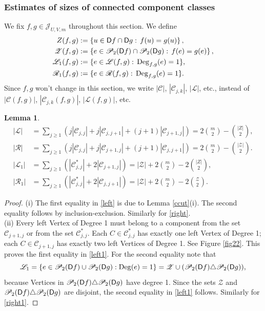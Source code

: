 \documentclass[reqno]{amsart}
\theoremstyle{theorem}
\newtheorem{lemma}[theorem]{Lemma}
\theoremstyle{definition}
\theoremstyle{remark}
\def\PP{\mathscr{P}}
\def\LL{\mathscr{L}}
\def\RR{\mathscr{R}}
\def\CC{\mathscr{C}}
\newcommand{\1}{{\text{\Large $\mathfrak 1$}}}	%
\numberwithin{equation}{section}
\def\JJ{\mathscr J}
\def\dom{{\sf D}}
\def\Deg{\operatorname{Deg}}
\def\xor{\text{\footnotesize$\triangle$}}
\def\ZZ{\mathscr Z}
\begin{document}
\subsubsection{\bfseries Estimates of sizes of connected component classes}
We fix $f,g \in \JJ_{U,V,m}$ throughout this section. We define
\begin{align}
Z(f,g) &:= \left\{ u \in \dom f \cap \dom g:\, f(u) = g(u) \right\},
\label{Zfg}
\\
\ZZ(f,g) &:= \left\{ e \in \PP_2(\dom f) \cap \PP_2(\dom g) :\, 
f(e) = g(e) \right\},
\nonumber
\\
\LL_1(f,g) &:= \{e \in \LL(f,g):\, \Deg_{f,g}(e)=1\},
\nonumber
\\
\RR_1(f,g) &:= \{e \in \RR(f,g):\, \Deg_{f,g}(e)=1\}.
\nonumber
\end{align}  
Since $f, g$ won't change in this section,
we write $|\CC|$,  $|\CC_{j,k}|$, $|\LL|$, etc.,
instead of $|\CC(f,g)|$, $|\CC_{j,k}(f,g)|$, $|\LL(f,g)|$, etc. 

\begin{lemma}
\label{sigmaident}
\begin{align}
|\LL| &= 
\sum_{j\ge 1} (j |\CC_{j,j}| + j |\CC_{j,j+1}| + (j+1) |\CC_{j+1,j}| )
= 2 \binom{m}{2} - \binom{|Z|}{2},
\label{left}
\\
|\RR|&=\sum_{j\ge 1} (j |\CC_{j,j}| + j |\CC_{j+1,j}| + (j+1) |\CC_{j,j+1}| )
= 2 \binom{m}{2} - \binom{|\ZZ|}{2}.
\label{right}
\\
|\LL_1|&=\sum_{j\ge 1} (|\CC_{j,j}^*| + 2 |\CC_{j+1,j}|)
= |\ZZ| +  2 \binom{m}{2} - 2 \binom{|Z|}{2},
\label{left1}
\\
|\RR_1|&=\sum_{j\ge 1} (|\CC_{j,j}^*| + 2 |\CC_{j,j+1}|)
= |\ZZ| +  2 \binom{m}{2} - 2 \binom{\ZZ}{2}.
\label{right1}
\end{align}
\end{lemma}

\begin{proof}
(i)
The first equality in \eqref{left} is due to Lemma \ref{ccut}(i). 
The second equality follows by inclusion-exclusion.
Similarly for \eqref{right}.
\\
(ii)  
Every left Vertex of Degree 1 must belong to a component from the set $\CC_{j+1,j}$
or from the set $\CC_{j,j}^*$. Each $C \in \CC^*_{j,j}$ has exactly one left
Vertex of Degree 1; each $C \in \CC_{j+1,j}$ has exactly two left
Vertices  of Degree 1. See Figure \ref{fig22}. This proves the first equality 
in \eqref{left1}.
For the second equality note that
\[
\LL_1= \{e \in \PP_2(\dom f) \cup \PP_2(\dom g): \Deg(e)=1\}
= \ZZ
\cup (\PP_2(\dom f) \xor \PP_2(\dom g)),
\]
because Vertices in $\PP_2(\dom f) \xor \PP_2(\dom g)$ have degree 1.
Since the sets $\ZZ$ and $\PP_2(\dom f) \xor \PP_2(\dom g)$ are disjoint,
the second equality in \eqref{left1} follows.
Similarly for \eqref{right1}.
\end{proof}
\end{document}
